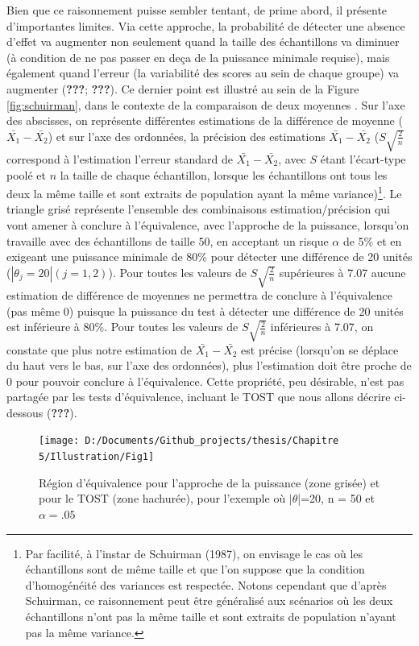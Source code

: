 \documentclass[
  english,
  man]{apa6}
\begin{document}
Bien que ce raisonnement puisse sembler tentant, de prime abord, il présente d'importantes limites. Via cette approche, la probabilité de détecter une absence d'effet va augmenter non seulement quand la taille des échantillons va diminuer (à condition de ne pas passer en deça de la puissance minimale requise), mais également quand l'erreur (la variabilité des scores au sein de chaque groupe) va augmenter ({\textbf{???}}; {\textbf{???}}). Ce dernier point est illustré au sein de la Figure \ref{fig:schuirman}, dans le contexte de la comparaison de deux moyennes . Sur l'axe des abscisses, on représente différentes estimations de la différence de moyenne (\(\bar{X_1}-\bar{X_2}\)) et sur l'axe des ordonnées, la précision des estimations \(\bar{X_1}-\bar{X_2}\) (\(S\sqrt{\frac{2}{n}}\) correspond à l'estimation l'erreur standard de \(\bar{X_1}-\bar{X_2}\), avec \(S\) étant l'écart-type poolé et \(n\) la taille de chaque échantillon, lorsque les échantillons ont tous les deux la même taille et sont extraits de population ayant la même variance)\footnote{Par facilité, à l'instar de Schuirman (1987), on envisage le cas où les échantillons sont de même taille et que l'on suppose que la condition d'homogénéité des variances est respectée. Notons cependant que d'après Schuirman, ce raisonnement peut être généralisé aux scénarios où les deux échantillons n'ont pas la même taille et sont extraits de population n'ayant pas la même variance.}. Le triangle grisé représente l'ensemble des combinaisons estimation/précision qui vont amener à conclure à l'équivalence, avec l'approche de la puissance, lorsqu'on travaille avec des échantillons de taille 50, en acceptant un risque \(\alpha\) de 5\% et en exigeant une puissance minimale de 80\% pour détecter une différence de 20 unités (\(|\theta_j=20| (j=1,2)\)). Pour toutes les valeurs de \(S\sqrt{\frac{2}{n}}\) supérieures à 7.07 aucune estimation de différence de moyennes ne permettra de conclure à l'équivalence (pas même 0) puisque la puissance du test à détecter une différence de 20 unités est inférieure à 80\%. Pour toutes les valeurs de \(S\sqrt{\frac{2}{n}}\) inférieures à 7.07, on constate que plus notre estimation de \(\bar{X_1}-\bar{X_2}\) est précise (lorsqu'on se déplace du haut vers le bas, sur l'axe des ordonnées), plus l'estimation doit être proche de 0 pour pouvoir conclure à l'équivalence. Cette propriété, peu désirable, n'est pas partagée par les tests d'équivalence, incluant le TOST que nous allons décrire ci-dessous ({\textbf{???}}).

\begin{figure}

{\centering \texttt{[image: D:/Documents/Github\_projects/thesis/Chapitre 5/Illustration/Fig1]} 

}

\caption{Région d'équivalence pour l'approche de la puissance (zone grisée) et pour le TOST (zone hachurée), pour l'exemple où $|\theta$|=20, n = 50 et $\alpha=.05$}\label{fig:schuirman2}
\end{figure}
\end{document}
